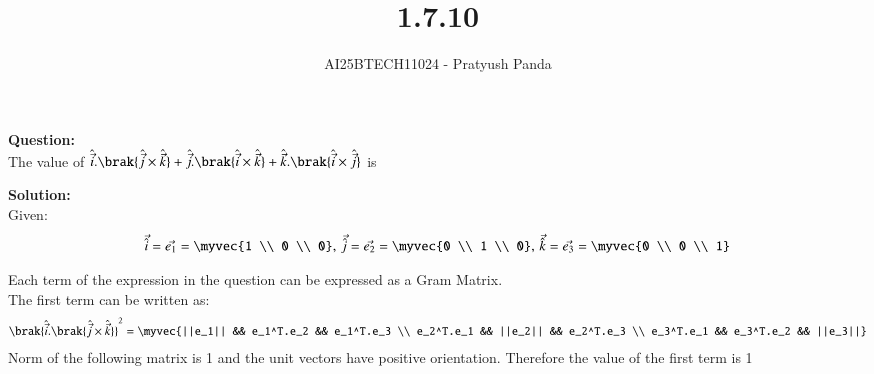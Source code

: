 \documentclass[journal]{IEEEtran}
\begin{document}

\vspace{3cm}

\title{1.7.10}
\author{AI25BTECH11024 - Pratyush Panda
}
\maketitle
{\let\newpage\relax\maketitle}

\renewcommand{\thefigure}{\theenumi}
\renewcommand{\thetable}{\theenumi}
\setlength{\intextsep}{10pt} %


\renewcommand{\thetable}{\theenumi}

\textbf{Question: } \\
The value of $\hat{\Vec{i}}.\brak{\hat{\Vec{j}} \times \hat{\Vec{k}}} + \hat{\Vec{j}}.\brak{\hat{\Vec{i}} \times \hat{\Vec{k}}} + \hat{\Vec{k}}.\brak{\hat{\Vec{i}} \times \hat{\Vec{j}}}$ is \underline{\hspace{2cm}}
\vspace{0.5cm}

\textbf{Solution: } \\
Given:
\begin{align}
\Vec{\hat{i}}=\Vec{e_1}=\myvec{1 \\ 0 \\ 0}, \, \Vec{\hat{j}}=\Vec{e_2}=\myvec{0 \\ 1 \\ 0}, \, \Vec{\hat{k}}=\Vec{e_3}=\myvec{0 \\ 0 \\ 1}
\end{align}

Each term of the expression in the question can be expressed as a Gram Matrix.\\
The first term can be written as:
\begin{align}
\brak{\hat{\Vec{i}}.\brak{\hat{\Vec{j}} \times \hat{\Vec{k}}}}^2 = 
\myvec{||e_1|| && e_1^T.e_2 && e_1^T.e_3 \\
       e_2^T.e_1 && ||e_2|| && e_2^T.e_3 \\
       e_3^T.e_1 && e_3^T.e_2 && ||e_3||}
\end{align}
Norm of the following matrix is 1 and the unit vectors have positive orientation. Therefore the value of the first term is 1
\end{document}
